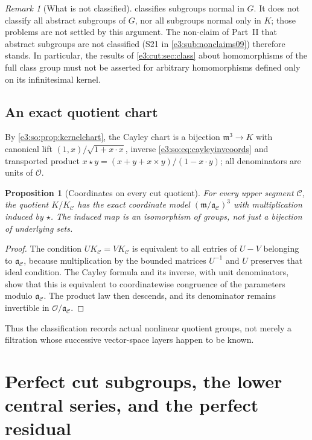 \documentclass[11pt,letterpaper]{article}
\numberwithin{equation}{section}
\newtheorem{proposition}[proposition]{Proposition}
\theoremstyle{definition}
\theoremstyle{remark}
\newtheorem{remark}[remark]{Remark}
\newcommand{\OO}{\mathcal O}
\newcommand{\mm}{\mathfrak m}
\begin{document}
\begin{remark}[What is not classified]\label{e3:cut:rem:notclassified}
 classifies subgroups normal in $G$. It does not
classify all abstract subgroups of $G$, nor all subgroups normal only in $K$;
those problems are not settled by this argument. The non-claim of Part~II that
abstract subgroups are not classified (S21 in \cref{e3:sub:nonclaims09})
therefore stands. In particular, the results of \cref{e3:cut:sec:class} about
homomorphisms of the full class group must not be asserted for arbitrary
homomorphisms defined only on its infinitesimal kernel.
\end{remark}

\subsection{An exact quotient chart}

By \cref{e3:so:prop:kernelchart}, the Cayley chart is a bijection
$\mm^3\to K$ with canonical lift $(1,x)/\sqrt{1+x\cdot x}$, inverse
\cref{e3:so:eq:cayleyinvcoords} and transported product
$x\star y=(x+y+x\times y)/(1-x\cdot y)$; all denominators are units of $\OO$.

\begin{proposition}[Coordinates on every cut quotient]\label{e3:cut:prop:quotient}
For every upper segment $\mathcal C$, the quotient $K/K_{\mathcal C}$ has the
exact coordinate model $(\mm/\mathfrak a_{\mathcal C})^3$ with multiplication
induced by $\star$. The induced map is an isomorphism of groups, not just a
bijection of underlying sets.
\end{proposition}
\begin{proof}
The condition $UK_{\mathcal C}=VK_{\mathcal C}$ is equivalent to all entries
of $U-V$ belonging to $\mathfrak a_{\mathcal C}$, because multiplication by
the bounded matrices $U^{-1}$ and $U$ preserves that ideal condition. The
Cayley formula and its inverse, with unit denominators, show that this is
equivalent to coordinatewise congruence of the parameters modulo
$\mathfrak a_{\mathcal C}$. The product law then descends, and its
denominator remains invertible in $\OO/\mathfrak a_{\mathcal C}$.
\end{proof}

Thus the classification records actual nonlinear quotient groups, not merely a
filtration whose successive vector-space layers happen to be known.

\section{Perfect cut subgroups, the lower central series, and the perfect residual}\label{e3:cut:sec:perfect}
\end{document}
